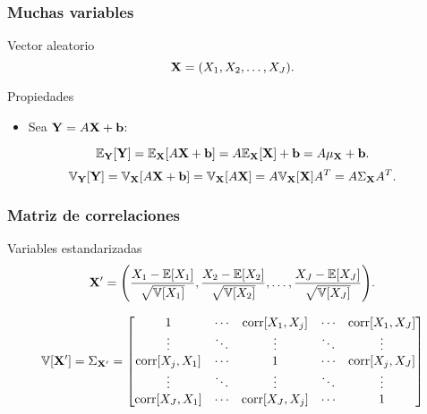 \documentclass[table]{beamer}
\begin{document}
\begin{frame}
    \frametitle{Muchas variables}
    \begin{block}{Vector aleatorio}
        \begin{equation*}
            \Xvec = \parens{X_{1}, X_{2}, \ldots , X_{J}} .
        \end{equation*}
    \end{block}
    \begin{block}{Propiedades}
        \begin{itemize}
            \item Sea $\mathbf{Y} = A \mathbf{X} + \mathbf{b}$:
        \end{itemize}
        \begin{equation*}
            \expecteddist{\Yvec}{\Yvec} = \expecteddist{\Xvec}{A \Xvec + \mathbf{b}}
            = A \expecteddist{\Xvec}{\Xvec} + \mathbf{b}
            = A \mu_{\Xvec} + \mathbf{b} .
        \end{equation*}
        \begin{equation*}
            \variancedist{\Yvec}{\Yvec} = \variancedist{\Xvec}{A \Xvec + \mathbf{b}}
            = \variancedist{\Xvec}{A \Xvec}
            = A \variancedist{\Xvec}{\Xvec} A^{T}
            = A \Sigma_{\Xvec} A^{T} .
        \end{equation*}
    \end{block}
\end{frame}

\begin{frame}
    \frametitle{Matriz de correlaciones}
    \begin{block}{Variables estandarizadas}
        \begin{equation*}
            \Xvec' = \parens{\frac{X_{1} - \expected{X_{1}}}{\sqrt{\variance{X_{1}}}} ,
            \frac{X_{2} - \expected{X_{2}}}{\sqrt{\variance{X_{2}}}} ,
            \ldots ,
            \frac{X_{J} - \expected{X_{J}}}{\sqrt{\variance{X_{J}}}}} .
        \end{equation*}
    \end{block}
    \begin{equation*}
        \variance{\Xvec'} = \Sigma_{\Xvec'} =
        \begin{bmatrix}
            1 & \cdots & \corr{X_{1} , X_{j}} & \cdots & \corr{X_{1} , X_{J}} \\
            \vdots & \ddots & \vdots & \ddots & \vdots \\
            \corr{X_{j} , X_{1}} & \cdots & 1 & \cdots & \corr{X_{j} , X_{J}} \\
            \vdots & \ddots & \vdots & \ddots & \vdots \\
            \corr{X_{J} , X_{1}} & \cdots & \corr{X_{J} , X_{j}} & \cdots & 1 \\
        \end{bmatrix}
    \end{equation*}
\end{frame}
\end{document}
